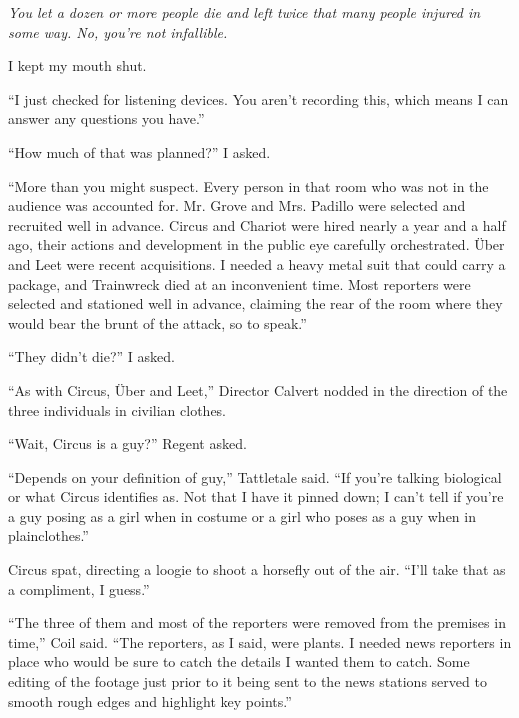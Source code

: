 \emph{You let a dozen or more people die and left twice that many people injured in some way.  No, you're not infallible.}



I kept my mouth shut.



``I just checked for listening devices.  You aren't recording this, which means I can answer any questions you have.''



``How much of that was planned?''  I asked.



``More than you might suspect.  Every person in that room who was not in the audience was accounted for.  Mr. Grove and Mrs. Padillo were selected and recruited well in advance.  Circus and Chariot were hired nearly a year and a half ago, their actions and development in the public eye carefully orchestrated.  \"{U}ber and Leet were recent acquisitions.  I needed a heavy metal suit that could carry a package, and Trainwreck died at an inconvenient time.  Most reporters were selected and stationed well in advance, claiming the rear of the room where they would bear the brunt of the attack, so to speak.''



``They didn't die?'' I asked.



``As with Circus, \"{U}ber and Leet,'' Director Calvert nodded in the direction of the three individuals in civilian clothes.



``Wait, Circus is a guy?'' Regent asked.



``Depends on your definition of guy,'' Tattletale said.  ``If you're talking biological or what Circus identifies as.  Not that I have it pinned down; I can't tell if you're a guy posing as a girl when in costume or a girl who poses as a guy when in plainclothes.''



Circus spat, directing a loogie to shoot a horsefly out of the air.  ``I'll take that as a compliment, I guess.''



``The three of them and most of the reporters were removed from the premises in time,'' Coil said.  ``The reporters, as I said, were plants.  I needed news reporters in place who would be sure to catch the details I wanted them to catch.  Some editing of the footage just prior to it being sent to the news stations served to smooth rough edges and highlight key points.''



